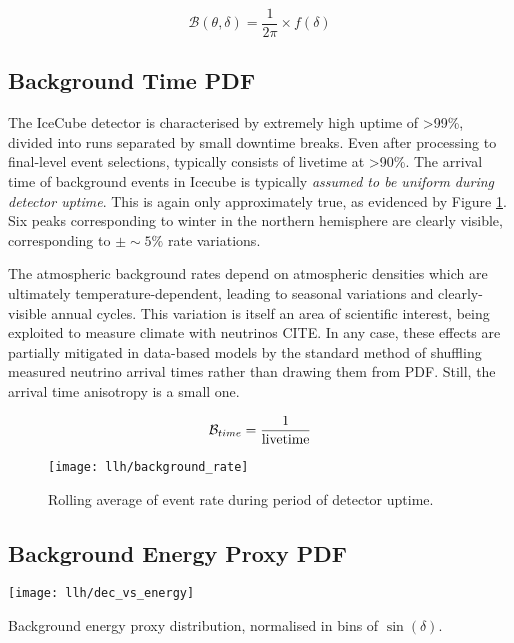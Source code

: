 \begin{equation}
\mathcal{B} (\theta, \delta) = \frac{1}{2\pi} \times f(\delta)
\end{equation}

\subsection{Background Time PDF}

The IceCube detector is characterised by extremely high uptime of >99\%, divided into runs separated by small downtime breaks. Even after processing to final-level event selections, typically consists of livetime at >90\%. The arrival time of background events in Icecube is typically \emph{assumed to be uniform during detector uptime}. This is again only approximately true, as evidenced by Figure \ref{fig:background_rate}.  Six peaks corresponding to winter in the northern hemisphere are clearly visible, corresponding to $\pm \sim5\%$ rate variations.

The atmospheric background rates depend on atmospheric densities which are ultimately temperature-dependent, leading to seasonal variations and clearly-visible annual cycles. This variation is itself an area of scientific interest, being exploited to measure climate with neutrinos CITE. In any case, these effects are partially mitigated in data-based models by the standard method of shuffling measured neutrino arrival times rather than drawing them from PDF. Still, the arrival time anisotropy is a small one.

\begin{equation}
\mathcal{B}_{time} = \frac{1}{\textup{livetime}}
\end{equation}

\begin{figure}[!ht]
	\centering \texttt{[image: llh/background\_rate]}
	\caption{Rolling average of event rate during period of detector uptime.}
	\label{fig:background_rate}
\end{figure}

\subsection{Background Energy Proxy PDF}


\begin{marginfigure}
	\centering \texttt{[image: llh/dec\_vs\_energy]}
	\caption{Background energy proxy distribution, normalised in bins of $\sin(\delta)$.}
	\label{fig:dec_vs_energy}
\end{marginfigure}

